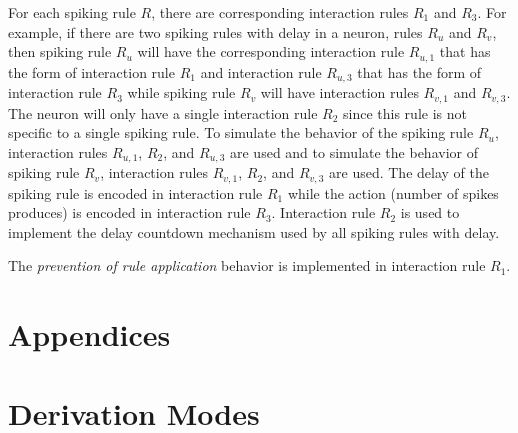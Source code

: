 \documentclass[a4paper]{article}
\theoremstyle{definition}
\begin{document}
For each spiking rule $R$, there are corresponding interaction rules $R_1$ and $R_3$. For example, 
if there are two spiking rules with delay in a neuron, rules $R_u$ and $R_v$, then spiking rule $R_u$
will have the corresponding interaction rule $R_{u,1}$ that has the form of interaction rule $R_1$ and
interaction rule $R_{u,3}$ that has the form of interaction rule $R_3$ while spiking rule $R_v$
will have interaction rules $R_{v,1}$ and $R_{v,3}$. The neuron will only have a single interaction
rule $R_2$ since this rule is not specific to a single spiking rule. To simulate the behavior of
the spiking rule $R_u$, interaction rules $R_{u,1}$, $R_2$, and $R_{u,3}$ are used and to simulate
the behavior of spiking rule $R_v$, interaction rules $R_{v,1}$, $R_2$, and $R_{v,3}$ are used.
The delay of the spiking rule is encoded in interaction rule $R_1$ while the action (number of
spikes produces) is encoded in interaction rule $R_3$. Interaction rule $R_2$ is used to implement
the delay countdown mechanism used by all spiking rules with delay.

The \emph{prevention of rule application} behavior is implemented in interaction rule $R_1$. 


\appendix{}

\section*{Appendices}\label{app}
\section{Derivation Modes}\label{app-derivation}

\cite{freund-2007-ff-1}
\end{document}
